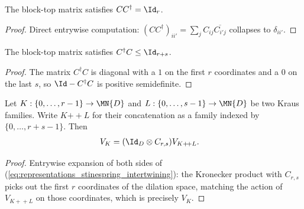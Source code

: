 \begin{lemma}[$C$ is a co-isometry]\label{lem:block_top_rows_co_isometry}
    \leanok
    The block-top matrix satisfies $CC^\dagger=\Id_r$.
\end{lemma}

\begin{proof}\leanok
    Direct entrywise computation:
    $(CC^\dagger)_{ii'}=\sum_jC_{ij}\overline{C_{i'j}}$
    collapses to $\delta_{ii'}$.
\end{proof}

\begin{lemma}[$C$ is a contraction]\label{lem:block_top_rows_contraction}
    \leanok
    The block-top matrix satisfies $C^\dagger C\le\Id_{r+s}$.
\end{lemma}

\begin{proof}\leanok
    The matrix $C^\dagger C$ is diagonal with a $1$ on the first $r$
    coordinates and a $0$ on the last $s$, so $\Id-C^\dagger C$ is
    positive semidefinite.
\end{proof}

\begin{lemma}\label{lem:stinespring_intertwine_append}
    \leanok
    Let $K:\{0,\ldots,r-1\}\to\MN{D}$ and
    $L:\{0,\ldots,s-1\}\to\MN{D}$ be two Kraus families. Write
    $K\mathbin{+\!+}L$ for their concatenation as a family indexed by
    $\{0,\ldots,r+s-1\}$. Then
    \begin{align}
        V_K
        &=(\Id_D\otimes C_{r,s})V_{K+\!+L}.
        \label{eq:representations_stinespring_intertwining}
    \end{align}
\end{lemma}

\begin{proof}\leanok
    Entrywise expansion of both sides of
    (\ref{eq:representations_stinespring_intertwining}): the Kronecker product
    with $C_{r,s}$ picks out the first $r$ coordinates of the dilation space,
    matching the action of $V_{K+\!+L}$ on those coordinates, which is
    precisely $V_K$.
\end{proof}

